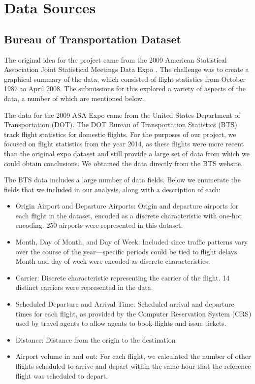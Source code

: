 \documentclass[twocolumn]{article}
\begin{document}
\section{Data Sources}

\label{sec:data-sources}
\subsection{Bureau of Transportation Dataset}

The original idea for the project came from the 2009 American Statistical Association Joint Statistical Meetings Data Expo \citep{wickham2011asa}.
The challenge was to create a graphical summary of the data, which consisted of flight statistics from October 1987 to April 2008.
The submissions for this explored a variety of aspects of the data, a number of which are mentioned below.

The data for the 2009 ASA Expo came from the United States Department of Transportation (DOT).
The DOT Bureau of Transportation Statistics (BTS) track flight statistics for domestic flights. 
For the purposes of our project, we focused on flight statistics from the year 2014, as these flights were more recent than the original expo dataset and still provide a large set of data from which we could obtain conclusions. 
We obtained the data directly from the BTS website.

The BTS data includes a large number of data fields. Below we enumerate the fields that we included in our analysis, along with a description of each:

\begin{itemize}
\item Origin Airport and Departure Airports: Origin and departure airports for each flight in the dataset, encoded as a discrete characteristic with one-hot encoding. 250 airports were represented in this dataset.
\item Month, Day of Month, and Day of Week: Included since traffic patterns vary over the course of the year---specific periods could be tied to flight delays. Month and day of week were encoded as discrete characteristics.
\item Carrier: Discrete characteristic representing the carrier of the flight. 14 distinct carriers were represented in the data.
\item Scheduled Departure and Arrival Time: Scheduled arrival and departure times for each flight, as provided by the Computer Reservation System (CRS) used by travel agents to allow agents to book flights and issue tickets.
\item Distance: Distance from the origin to the destination
\item Airport volume in and out: For each flight, we calculated the number of other flights scheduled to arrive and depart within the same hour that the reference flight was scheduled to depart. 
\end{itemize}
\end{document}
